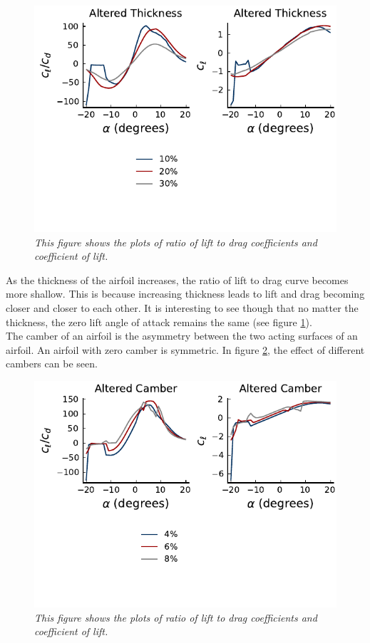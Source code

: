 \documentclass{journal}
\begin{document}
	\begin{figure}[H]
		\centering
		\includegraphics{../graphics/altered-thickness.pdf}
		\caption{\emph{This figure shows the plots of ratio of lift to drag coefficients and coefficient of lift.}}
		\label{fig:altered-thickness}
	\end{figure}
	
	As the thickness of the airfoil increases, the ratio of lift to drag curve becomes more shallow. This is because increasing thickness leads to lift and drag becoming closer and closer to each other. It is interesting to see though that no matter the thickness, the zero lift angle of attack remains the same (see figure \ref{fig:altered-thickness}).\\
	
	The camber of an airfoil is the asymmetry between the two acting surfaces of an airfoil. An airfoil with zero camber is symmetric. In figure \ref{fig:altered-camber}, the effect of different cambers can be seen.\\
	
	\begin{figure}[H]
		\centering
		\includegraphics{../graphics/altered-camber.pdf}
		\caption{\emph{This figure shows the plots of ratio of lift to drag coefficients and coefficient of lift.}}
		\label{fig:altered-camber}
	\end{figure}
	
\end{document}
